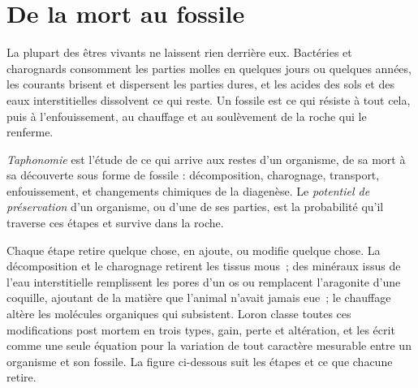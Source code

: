 \section{De la mort au fossile}\label{sec:b2:palaeoenvironments:taphonomy}

La plupart des êtres vivants ne laissent rien derrière eux. Bactéries et charognards consomment les
parties molles en quelques jours ou quelques années, les courants brisent et dispersent les parties dures,
et les acides des sols et des eaux interstitielles dissolvent ce qui reste. Un fossile est ce qui
résiste à tout cela, puis à l'enfouissement, au chauffage et au soulèvement de la roche qui le renferme.

\begin{definition}\label{def:b2:palaeoenvironments:taphonomy}
\emph{Taphonomie} est l'étude de ce qui arrive aux
restes d'un organisme, de sa mort à sa découverte sous forme de fossile : décomposition,
charognage, transport, enfouissement, et changements chimiques de la diagenèse. Le
\emph{potentiel de préservation} d'un organisme, ou d'une
de ses parties, est la probabilité qu'il traverse ces étapes et survive dans la roche.
\end{definition}

Chaque étape retire quelque chose, en ajoute, ou modifie quelque chose. La décomposition et le charognage
retirent les tissus mous~; des minéraux issus de l'eau interstitielle remplissent les pores d'un os ou
remplacent l'aragonite d'une coquille, ajoutant de la matière que l'animal n'avait jamais eue~; le chauffage
altère les molécules organiques qui subsistent. Loron classe toutes ces modifications post mortem en trois
types, gain, perte et altération, et les écrit comme une seule équation pour la variation de tout caractère
mesurable entre un organisme et son fossile. La figure ci-dessous suit les étapes et ce que chacune retire.

